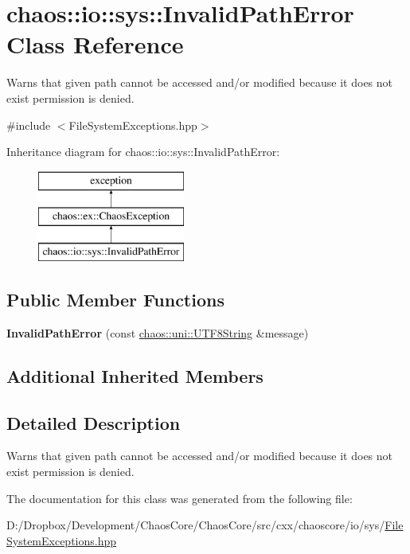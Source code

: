 \hypertarget{classchaos_1_1io_1_1sys_1_1_invalid_path_error}{}\section{chaos\+:\+:io\+:\+:sys\+:\+:Invalid\+Path\+Error Class Reference}
\label{classchaos_1_1io_1_1sys_1_1_invalid_path_error}


Warns that given path cannot be accessed and/or modified because it does not exist permission is denied.  




{\ttfamily \#include $<$File\+System\+Exceptions.\+hpp$>$}

Inheritance diagram for chaos\+:\+:io\+:\+:sys\+:\+:Invalid\+Path\+Error\+:\begin{figure}[H]
\begin{center}
\leavevmode
\includegraphics[height=3.000000cm]{classchaos_1_1io_1_1sys_1_1_invalid_path_error}
\end{center}
\end{figure}
\subsection*{Public Member Functions}
\begin{DoxyCompactItemize}
\item 
\hypertarget{classchaos_1_1io_1_1sys_1_1_invalid_path_error_a132ec813c227f40ffe9f3e3d64618a68}{}{\bfseries Invalid\+Path\+Error} (const \hyperlink{classchaos_1_1uni_1_1_u_t_f8_string}{chaos\+::uni\+::\+U\+T\+F8\+String} \&message)\label{classchaos_1_1io_1_1sys_1_1_invalid_path_error_a132ec813c227f40ffe9f3e3d64618a68}

\end{DoxyCompactItemize}
\subsection*{Additional Inherited Members}


\subsection{Detailed Description}
Warns that given path cannot be accessed and/or modified because it does not exist permission is denied. 

The documentation for this class was generated from the following file\+:\begin{DoxyCompactItemize}
\item 
D\+:/\+Dropbox/\+Development/\+Chaos\+Core/\+Chaos\+Core/src/cxx/chaoscore/io/sys/\hyperlink{_file_system_exceptions_8hpp}{File\+System\+Exceptions.\+hpp}\end{DoxyCompactItemize}
